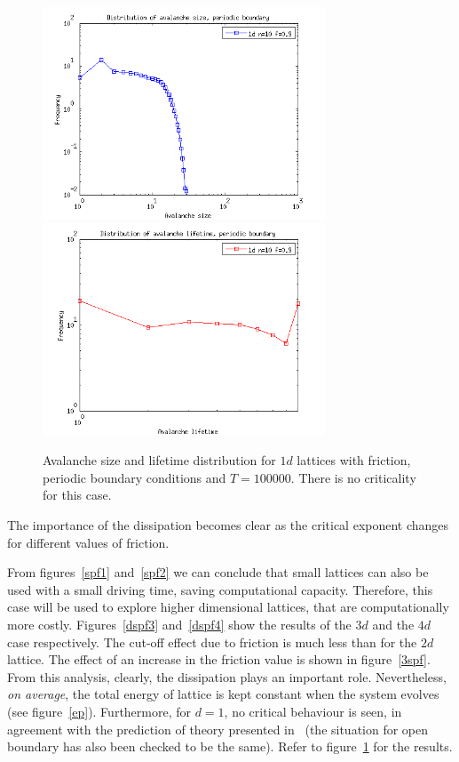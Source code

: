 \begin{figure}
\begin{center}
\includegraphics[width=0.75\textwidth]{results/1sp.png}
\includegraphics[width=0.75\textwidth]{results/1tp.png}
\caption{Avalanche size and lifetime distribution for $1d$ lattices with friction, periodic boundary conditions and $T=100 000$. There is no criticality for this case. }
\label{1p}
\end{center}
\end{figure} 



The importance of the dissipation becomes clear as the critical exponent changes for different values of friction.

From figures~\ref{spf1} and~\ref{spf2} we can conclude that small lattices can also be used with a small driving time, saving computational capacity. Therefore, this case will be used to explore higher dimensional lattices, that are computationally more costly. Figures~\ref{dspf3} and~\ref{dspf4} show the results of the $3d$ and the $4d$ case respectively. The cut-off effect due to friction is much less than for the $2d$ lattice. The effect of an increase in the friction value is shown in figure~\ref{3spf}. From this analysis, clearly, the dissipation plays an important role. Nevertheless, \emph{on average}, the total energy of lattice is kept constant when the system evolves (see figure~\ref{ep}). Furthermore, for $d=1$, no critical behaviour is seen, in agreement with the prediction of theory presented in~\cite{soc} (the situation for open boundary has also been checked to be the same). Refer to figure~\ref{1p} for the results.

